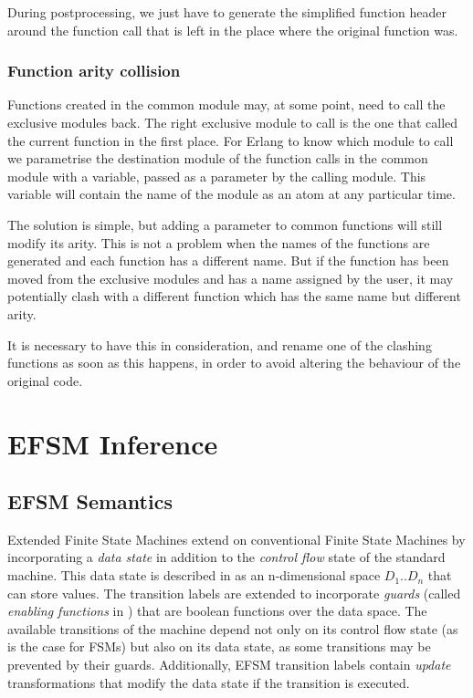 During postprocessing, we just have to generate the simplified function
header around the function call that is left in the place where the
original function was.


\subsubsection{Function arity collision\label{sub:function-arity-collision}}

Functions created in the common module may, at some point, need to
call the exclusive modules back. The right exclusive module to call
is the one that called the current function in the first place. For
Erlang to know which module to call we parametrise the destination
module of the function calls in the common module with a variable,
passed as a parameter by the calling module. This variable will contain
the name of the module as an atom at any particular time.

The solution is simple, but adding a parameter to common functions
will still modify its arity. This is not a problem when the names
of the functions are generated and each function has a different name.
But if the function has been moved from the exclusive modules and
has a name assigned by the user, it may potentially clash with a different
function which has the same name but different arity.

It is necessary to have this in consideration, and rename one of the
clashing functions as soon as this happens, in order to avoid altering
the behaviour of the original code.

\section{EFSM Inference}
\label{EFSMInference}

\subsection{EFSM Semantics}
\label{EFSMSemantics}

Extended Finite State Machines extend on conventional Finite State Machines by incorporating a \emph{data state} in addition to the \emph{control flow} state of the standard machine. This data state is described in \cite{EFSMs} as an n-dimensional space $D_{1} .. D_{n}$ that can store values. The transition labels are extended to incorporate \emph{guards} (called \emph{enabling functions} in \cite{EFSMs}) that are boolean functions over the data space. The available transitions of the machine depend not only on its control flow state (as is the case for FSMs) but also on its data state, as some transitions may be prevented by their guards. Additionally, EFSM transition labels contain \emph{update} transformations that modify the data state if the transition is executed. 

